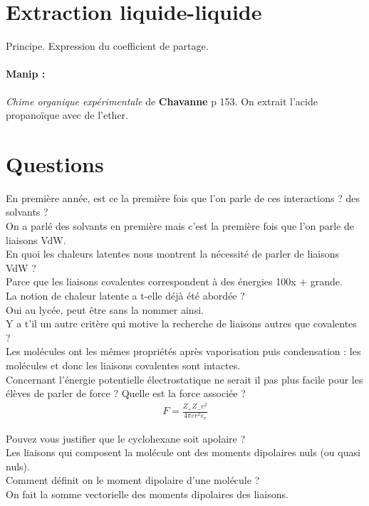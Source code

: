 \documentclass[12pt,prb,aps,epsf]{article}
\begin{document}
\section{Extraction liquide-liquide}
Principe. Expression du coefficient de partage.
\paragraph{Manip :} \textit{Chime organique expérimentale} de \textbf{Chavanne} p 153. On extrait l'acide propanoïque avec de l'ether.


\section*{Questions}
En première année, est ce la première fois que l'on parle de ces interactions ? des solvants ?\\
On a parlé des solvants en première mais c'est la première fois que l'on parle de liaisons VdW.\\

En quoi les chaleurs latentes nous montrent la nécessité de parler de liaisons VdW ?\\
Parce que les liaisons covalentes correspondent à des énergies 100x + grande.\\

La notion de chaleur latente a t-elle déjà été abordée ?\\
Oui au lycée, peut être sans la nommer ainsi.\\

Y a t'il un autre critère qui motive la recherche de liaisons autres que covalentes ?\\
Les molécules ont les mêmes propriétés après vaporisation puis condensation : les molécules et donc les liaisons covalentes sont intactes.\\

Concernant l'énergie potentielle électrostatique ne serait il pas plus facile pour les élèves de parler de force ? Quelle est la force associée ?
\begin{eqnarray}
F = \frac{Z_+Z_- e^2}{4\pi \varepsilon r^2 \varepsilon_r}
\end{eqnarray}

Pouvez vous justifier que le cyclohexane soit apolaire ?\\
Les liaisons qui composent la molécule ont des moments dipolaires nuls (ou quasi nuls).\\ 

Comment définit on le moment dipolaire d'une molécule ?\\
On fait la somme vectorielle des moments dipolaires des liaisons.\\
\end{document}
